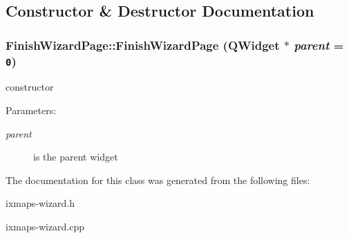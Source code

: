 \subsection{Constructor \& Destructor Documentation}
\hypertarget{classFinishWizardPage_22aafaadb5bb87d86f95d42d69241c0a}{
\subsubsection[FinishWizardPage]{\setlength{\rightskip}{0pt plus 5cm}FinishWizardPage::FinishWizardPage (QWidget $\ast$ {\em parent} = {\tt 0})}}
\label{classFinishWizardPage_22aafaadb5bb87d86f95d42d69241c0a}


constructor \begin{Desc}
\item[Parameters:]
\begin{description}
\item[{\em parent}]is the parent widget \end{description}
\end{Desc}


The documentation for this class was generated from the following files:\begin{CompactItemize}
\item 
ixmaps-wizard.h\item 
ixmaps-wizard.cpp\end{CompactItemize}
